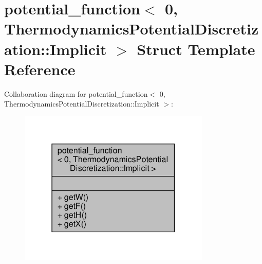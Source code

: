 \hypertarget{structpotential__function_3_010_00_01ThermodynamicsPotentialDiscretization_1_1Implicit_01_4}{}\section{potential\+\_\+function$<$ 0, Thermodynamics\+Potential\+Discretization\+:\+:Implicit $>$ Struct Template Reference}
\label{structpotential__function_3_010_00_01ThermodynamicsPotentialDiscretization_1_1Implicit_01_4}


Collaboration diagram for potential\+\_\+function$<$ 0, Thermodynamics\+Potential\+Discretization\+:\+:Implicit $>$\+:\nopagebreak
\begin{figure}[H]
\begin{center}
\leavevmode
\includegraphics[width=259pt]{structpotential__function_3_010_00_01ThermodynamicsPotentialDiscretization_1_1Implicit_01_4__coll__graph}
\end{center}
\end{figure}
